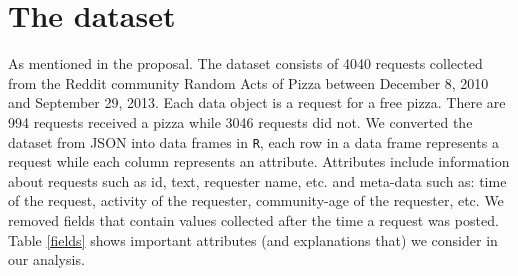 \section{The dataset}
As mentioned in the proposal. The dataset consists of 4040 requests collected from the Reddit community Random Acts of Pizza between December 8, 2010 and September 29, 2013. Each data object is a request for a free pizza. There are 994 requests received a pizza while 3046 requests did not. We converted the dataset from JSON into data frames in \texttt{R}, each row in a data frame represents a request while each column represents an attribute. Attributes include information about requests such as id, text, requester name, etc. and meta-data such as: time of the request, activity of the requester, community-age of the requester, etc. We removed fields that contain values collected after the time a request was posted. Table \ref{fields} shows important attributes (and explanations that) we consider in our analysis.


